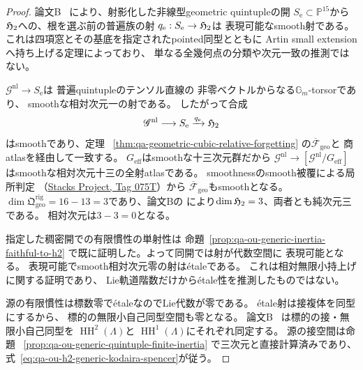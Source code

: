 \begin{proof}
論文B~\cite[\texttt{lem:universal-nonlinear-cubic-h2-family},
\texttt{thm:quintuple-chart-artin-lifting}]{QuadricModuli2026}
により、射影化した非線型geometric quintupleの開
$S_{\mathrm e}\subset\mathbb P^{15}$から
$\mathfrak H_2$への、根を選ぶ前の普遍族の射
$q_{\mathrm e}:S_{\mathrm e}\to\mathfrak H_2$は
表現可能なsmooth射である。
これは四項窓とその基底を指定されたpointed同型とともに
Artin small extensionへ持ち上げる定理によっており、
単なる全幾何点の分類や次元一致の推測ではない。

$\mathscr G^{\mathrm{nl}}\to S_{\mathrm e}$は
普遍quintupleのテンソル直線の
非零ベクトルからなる$\mathbb G_m$-torsorであり、
smoothな相対次元一の射である。
したがって合成
\[
 \mathscr G^{\mathrm{nl}}\longrightarrow
 S_{\mathrm e}\xrightarrow{q_{\mathrm e}}\mathfrak H_2
\]
はsmoothであり、定理
~\ref{thm:qa-geometric-cubic-relative-forgetting}
の$\overline{\mathcal F}_{\mathrm{geo}}$と
商atlasを経由して一致する。
$G_{\mathrm{eff}}$はsmoothな十三次元群だから
$\mathscr G^{\mathrm{nl}}\to
[\mathscr G^{\mathrm{nl}}/G_{\mathrm{eff}}]$
はsmoothな相対次元十三の全射atlasである。
smoothnessのsmooth被覆による局所判定
（\href{https://stacks.math.columbia.edu/tag/075T}{Stacks Project, Tag 075T}）から
$\overline{\mathcal F}_{\mathrm{geo}}$もsmoothとなる。
$\dim\mathfrak Q_{\mathrm{geo}}^{\mathrm{rig}}
=16-13=3$であり、論文Bの
\cite[\texttt{thm:global-h2-smooth-finite-type}]{QuadricModuli2026}
により$\dim\mathfrak H_2=3$、両者とも純次元三である。
相対次元は$3-3=0$となる。

指定した稠密開での有限慣性の単射性は
命題~\ref{prop:qa-ou-generic-inertia-faithful-to-h2}
で既に証明した。よって同開では射が代数空間に
表現可能となる。
表現可能でsmooth相対次元零の射はétaleである。
これは相対無限小持上げに関する証明であり、
Lie軌道階数だけからétale性を推測したものではない。

源の有限慣性は標数零でétaleなのでLie代数が零である。
étale射は接複体を同型にするから、
標的の無限小自己同型空間も零となる。
論文B~\cite[\texttt{cor:cubic-formal-h2-abelian}]{QuadricModuli2026}
は標的の接・無限小自己同型を
$\operatorname{HH}^2(\Lambda)$と
$\operatorname{HH}^1(\Lambda)$にそれぞれ同定する。
源の接空間は命題
~\ref{prop:qa-ou-generic-quintuple-finite-inertia}
で三次元と直接計算済みであり、
式~\eqref{eq:qa-ou-h2-generic-kodaira-spencer}が従う。
\end{proof}


